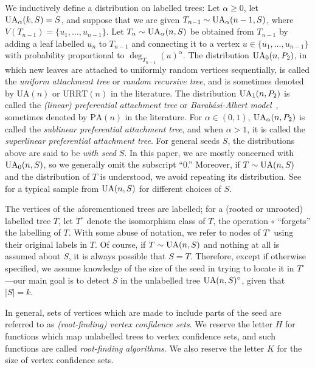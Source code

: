 We inductively define a distribution on labelled trees: Let
$\alpha \ge 0$, let $\operatorname{UA}_\alpha(k, S) = S$, and suppose that we are
given $T_{n - 1} \sim \operatorname{UA}_\alpha(n - 1, S)$, where
$V(T_{n - 1}) = \{u_1, \dots, u_{n - 1}\}$. Let
$T_n \sim \operatorname{UA}_\alpha(n, S)$ be obtained from $T_{n - 1}$ by adding a
leaf labelled $u_n$ to $T_{n - 1}$ and connecting it to a vertex
$u \in \{u_1, \dots, u_{n - 1}\}$ with probability proportional to
$\deg_{T_{n - 1}}(u)^\alpha$. The distribution $\operatorname{UA}_0(n, P_2)$, in
which new leaves are attached to uniformly random vertices
sequentially, is called the \emph{uniform attachment tree} or
\emph{random recursive tree}, and is sometimes denoted by
$\text{UA}(n)$ or $\text{URRT}(n)$ in the literature. The distribution
$\operatorname{UA}_1(n, P_2)$ is called the \emph{(linear) preferential attachment
  tree} or \emph{Barab\'{a}si-Albert model}~\cite{barabasi}, sometimes
denoted by $\text{PA}(n)$ in the literature. For $\alpha \in (0, 1)$,
$\operatorname{UA}_\alpha(n, P_2)$ is called the \emph{sublinear preferential
  attachment tree}, and when $\alpha > 1$, it is called the
\emph{superlinear preferential attachment tree}. For general seeds
$S$, the distributions above are said to be \emph{with seed $S$}. In
this paper, we are mostly concerned with $\operatorname{UA}_0(n, S)$, so we
generally omit the subscript ``0.''  Moreover, if $T \sim \operatorname{UA}(n, S)$
and the distribution of $T$ is understood, we avoid repeating its
distribution. See  for a typical sample from
$\operatorname{UA}(n, S)$ for different choices of $S$.

The vertices of the aforementioned trees are labelled; for a (rooted
or unrooted) labelled tree $T$, let $T^\circ$ denote the isomorphism
class of $T$, \ie the operation $\circ$ ``forgets'' the labelling of
$T$. With some abuse of notation, we refer to nodes of $T^\circ$ using
their original labels in $T$. Of course, if $T \sim \operatorname{UA}(n, S)$ and
nothing at all is assumed about $S$, it is always possible that
$S = T$. Therefore, except if otherwise specified, we assume knowledge
of the size of the seed in trying to locate it in $T^\circ$---our main
goal is to detect $S$ in the unlabelled tree $\operatorname{UA}(n, S)^\circ$, given
that $|S| = k$.

In general, sets of vertices which are made to include parts of the
seed are referred to as \emph{(root-finding) vertex confidence
  sets}. We reserve the letter $H$ for functions which map unlabelled
trees to vertex confidence sets, and such functions are called
\emph{root-finding algorithms}. We also reserve the letter $K$ for the
size of vertex confidence sets.

